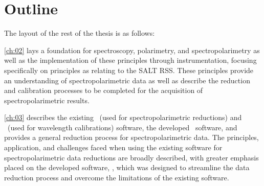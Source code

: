 



\section{Outline}

\noindent The layout of the rest of the thesis is as follows:

\autoref{ch:02} lays a foundation for spectroscopy, polarimetry, and spectropolarimetry as well as the implementation of these principles through instrumentation, focusing specifically on principles as relating to the \gls{SALT} \gls{RSS}.
These principles provide an understanding of spectropolarimetric data as well as describe the reduction and calibration processes to be completed for the acquisition of spectropolarimetric results.

\autoref{ch:03} describes the existing \polsalt\ (used for spectropolarimetric reductions) and \iraf\ (used for wavelength calibrations) software, the developed \stops\ software, and provides a general reduction process for spectropolarimetric data.
The principles, application, and challenges faced when using the existing software for spectropolarimetric data reductions are broadly described, with greater emphasis placed on the developed software, \stops, which was designed to streamline the data reduction process and overcome the limitations of the existing software.

